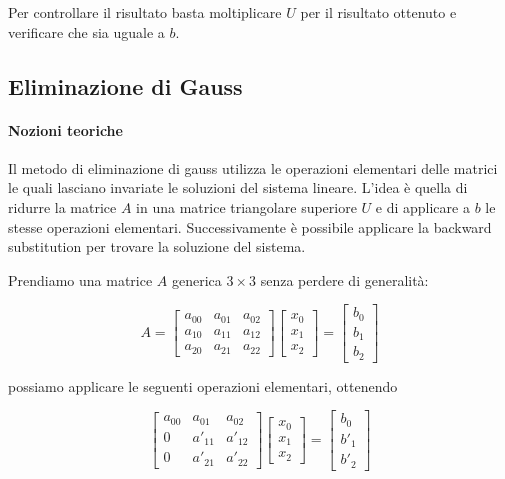 Per controllare il risultato basta moltiplicare $U$ per il risultato ottenuto e
verificare che sia uguale a $b$.

\subsection{Eliminazione di Gauss}

\paragraph{Nozioni teoriche}

Il metodo di eliminazione di gauss utilizza le operazioni elementari delle matrici
le quali lasciano invariate le soluzioni del sistema lineare. L'idea è quella di
ridurre la matrice $A$ in una matrice triangolare superiore $U$ e di applicare a $b$
le stesse operazioni elementari. Successivamente è possibile applicare la backward
substitution per trovare la soluzione del sistema.

Prendiamo una matrice $A$ generica $3 \times 3$ senza perdere di generalità:

$$
	A = \begin{bmatrix}
		a_{00} & a_{01} & a_{02} \\
		a_{10} & a_{11} & a_{12} \\
		a_{20} & a_{21} & a_{22}
	\end{bmatrix} \begin{bmatrix}
		x_0 \\ x_1 \\ x_2 \end{bmatrix} = \begin{bmatrix}
		b_0 \\ b_1 \\ b_2 \end{bmatrix}
$$

possiamo applicare le seguenti operazioni elementari, ottenendo

$$
	\begin{bmatrix}
		a_{00} & a_{01}  & a_{02}  \\
		0      & a'_{11} & a'_{12} \\
		0      & a'_{21} & a'_{22}
	\end{bmatrix} \begin{bmatrix}
		x_0 \\ x_1 \\ x_2 \end{bmatrix} = \begin{bmatrix}
		b_0 \\ b'_1 \\ b'_2 \end{bmatrix}
$$

